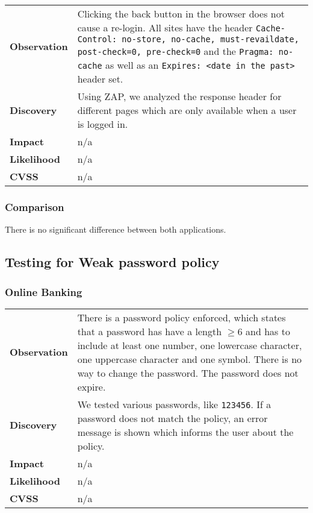 \begin{tabular}{l|p{10cm}}

\textbf{Observation} & Clicking the back button in the browser does not cause a re-login. All sites have the header \texttt{Cache-Control: no-store, no-cache, must-revaildate, post-check=0, pre-check=0} and the \texttt{Pragma: no-cache} as well as an \texttt{Expires: <date in the past>} header set. \\
\textbf{Discovery} & Using ZAP, we analyzed the response header for different pages which are only available when a user is logged in.\\
\textbf{Impact} & n/a \\
\textbf{Likelihood} & n/a \\
\textbf{CVSS} & n/a \\
\end{tabular}

\subsubsection*{Comparison}
There is no significant difference between both applications.

\clearpage


\subsection{Testing for Weak password policy}

\subsubsection*{Online Banking}

\begin{tabular}{l|p{10cm}}

\textbf{Observation} & There is a password policy enforced, which states that a password has have a length $\geq6$ and has to include at least one number, one lowercase character, one uppercase character and one symbol. There is no way to change the password. The password does not expire. \\
\textbf{Discovery} & We tested various passwords, like \texttt{123456}. If a password does not match the policy, an error message is shown which informs the user about the policy. \\
\textbf{Impact} & n/a \\
\textbf{Likelihood} & n/a \\
\textbf{CVSS} & n/a \\
\end{tabular}

